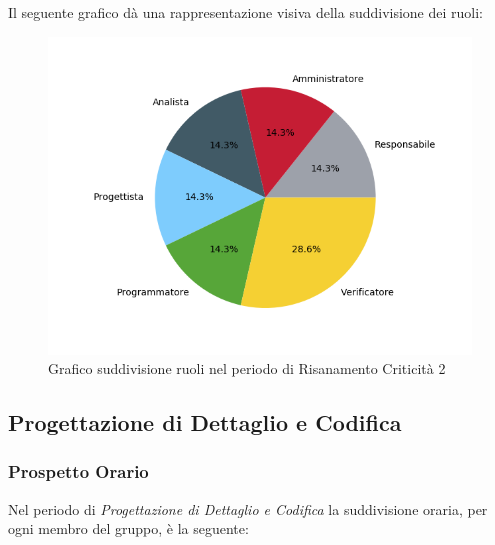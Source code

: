 Il seguente grafico dà una rappresentazione visiva della suddivisione dei ruoli:
\begin{figure}[H]
	\centering
  		\includegraphics[width=1\linewidth]{./images/torta_rc2.png}
  		\caption{Grafico suddivisione ruoli nel periodo di Risanamento Criticità 2}
  		\label{fig:grafico suddivione ruoli rc2}
\end{figure}

\newpage
\subsection{Progettazione di Dettaglio e Codifica}
\label{PPDC}
\subsubsection{Prospetto Orario}

Nel periodo di \textit{Progettazione di Dettaglio e Codifica} la suddivisione oraria, per ogni membro del gruppo, è la seguente:

